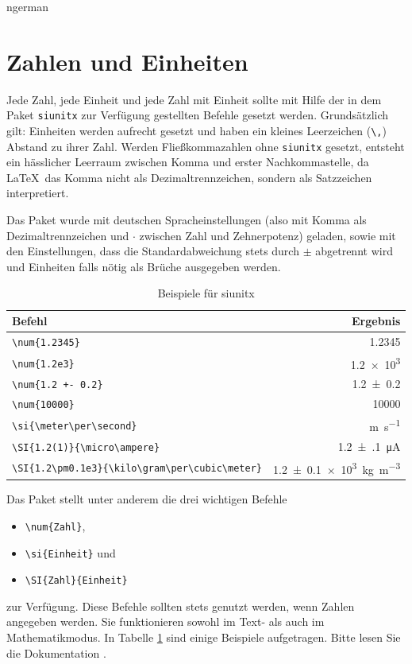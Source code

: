 \begin{foreignlanguage}{ngerman}
\section{Zahlen und Einheiten}

Jede Zahl, jede Einheit und jede Zahl mit Einheit sollte mit Hilfe der in dem Paket \texttt{siunitx} zur Verfügung gestellten Befehle gesetzt werden.
Grundsätzlich gilt: Einheiten werden aufrecht gesetzt und haben ein kleines Leerzeichen (\verb+\,+) Abstand zu ihrer Zahl. 
Werden Fließkommazahlen ohne \texttt{siunitx} gesetzt, entsteht ein hässlicher Leerraum zwischen Komma und erster Nachkommastelle, da \LaTeX \ das Komma nicht als Dezimaltrennzeichen, sondern als Satzzeichen interpretiert.

Das Paket wurde mit deutschen Spracheinstellungen (also mit Komma als Dezimaltrennzeichen und $\cdot$ zwischen Zahl und Zehnerpotenz) geladen, sowie mit den Einstellungen, dass die Standardabweichung stets durch $\pm$ abgetrennt wird und Einheiten falls nötig als Brüche ausgegeben werden.

\begin{table}
    \centering
    \caption{Beispiele für siunitx}
    \label{tab:si}
    \begin{tabular}{l r}
        \toprule
        Befehl     &   Ergebnis \\
        \midrule
        \verb+\num{1.2345}+ & \num{1.2345} \\
        \verb+\num{1.2e3}+ & \num{1.2e3} \\
        \verb_\num{1.2 +- 0.2}_ & \num{1.2+-0.2} \\
        \verb+\num{10000}+ & \num{10000} \\
        \verb+\si{\meter\per\second}+ & \si{\meter\per\second} \\
        \verb+\SI{1.2(1)}{\micro\ampere}+ & \SI{1.2(1)}{\micro\ampere} \\
        \verb+\SI{1.2\pm0.1e3}{\kilo\gram\per\cubic\meter}+ & \SI{1.2\pm0.1e3}{\kilo\gram\per\cubic\meter} \\
        \bottomrule 
    \end{tabular}
\end{table}

Das Paket stellt unter anderem die drei wichtigen Befehle
\begin{itemize}
    \item \texttt{\textbackslash num\{Zahl\}},
    \item \texttt{\textbackslash si\{Einheit\}} und
    \item \texttt{\textbackslash SI\{Zahl\}\{Einheit\}}
\end{itemize}
zur Verfügung.
Diese Befehle sollten stets genutzt werden, wenn Zahlen angegeben werden. 
Sie funktionieren sowohl im Text- als auch im Mathematikmodus.
In Tabelle \ref{tab:si} sind einige Beispiele aufgetragen. Bitte lesen Sie die Dokumentation .


\end{foreignlanguage}
